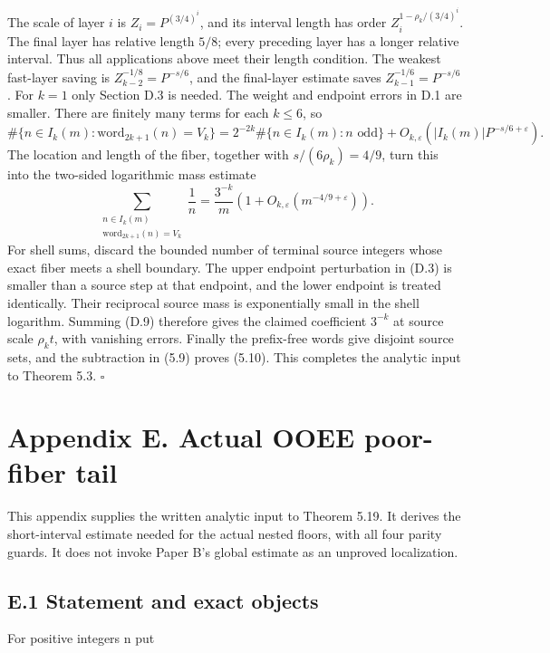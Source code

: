 \documentclass[11pt,a4paper]{article}
\begin{document}
The scale of layer \(i\) is \(Z_i=P^{(3/4)^i}\), and its interval length
has order \(Z_i^{1-\rho_k/(3/4)^i}\). The final layer has relative
length \(5/8\); every preceding layer has a longer relative interval.
Thus all applications above meet their length condition. The weakest
fast-layer saving is \(Z_{k-2}^{-1/8}=P^{-s/6}\), and the final-layer
estimate saves \(Z_{k-1}^{-1/6}=P^{-s/6}\). For \(k=1\) only Section D.3
is needed. The weight and endpoint errors in D.1 are smaller. There are
finitely many terms for each \(k\le6\), so \[
\#\{n\in I_k(m):\mathrm{word}_{2k+1}(n)=V_k\}
 =2^{-2k}\#\{n\in I_k(m):n\text{ odd}\}
 +O_{k,\varepsilon}(|I_k(m)|P^{-s/6+\varepsilon}).
\tag{D.8}
\] The location and length of the fiber, together with
\(s/(6\rho_k)=4/9\), turn this into the two-sided logarithmic mass
estimate \[
\sum_{\substack{n\in I_k(m)\\\mathrm{word}_{2k+1}(n)=V_k}}\frac1n
 =\frac{3^{-k}}m\left(1+O_{k,\varepsilon}
 (m^{-4/9+\varepsilon})\right).
\tag{D.9}
\] For shell sums, discard the bounded number of terminal source
integers whose exact fiber meets a shell boundary. The upper endpoint
perturbation in (D.3) is smaller than a source step at that endpoint,
and the lower endpoint is treated identically. Their reciprocal source
mass is exponentially small in the shell logarithm. Summing (D.9)
therefore gives the claimed coefficient \(3^{-k}\) at source scale
\(\rho_k t\), with vanishing errors. Finally the prefix-free words give
disjoint source sets, and the subtraction in (5.9) proves (5.10). This
completes the analytic input to Theorem 5.3. \(\square\)

\section{Appendix E. Actual OOEE poor-fiber
tail}\label{appendix-e.-actual-ooee-poor-fiber-tail}

This appendix supplies the written analytic input to Theorem 5.19. It
derives the short-interval estimate needed for the actual nested floors,
with all four parity guards. It does not invoke Paper B's global
estimate as an unproved localization.

\subsection{E.1 Statement and exact
objects}\label{e.1-statement-and-exact-objects}

For positive integers n put
\end{document}

